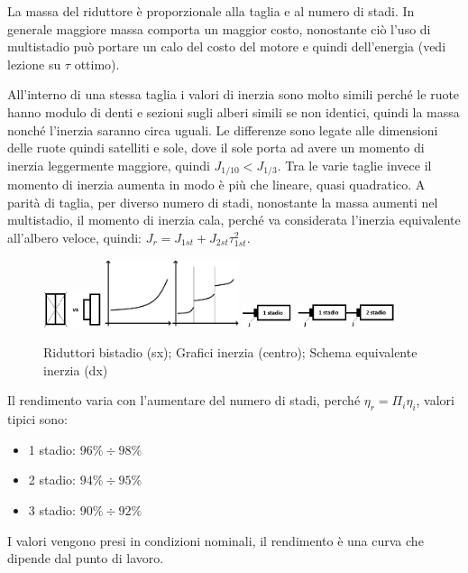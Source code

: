 La massa del riduttore è proporzionale alla taglia e al numero di stadi. 
In generale maggiore massa comporta un maggior costo, nonostante ciò l'uso di multistadio può portare un calo del costo del motore e quindi dell'energia (vedi lezione su $\tau$ ottimo).

All'interno di una stessa taglia i valori di inerzia sono molto simili perché le ruote hanno modulo di denti e sezioni sugli alberi simili se non identici, quindi la massa nonché l'inerzia saranno circa uguali.
Le differenze sono legate alle dimensioni delle ruote quindi satelliti e sole, dove il sole porta ad avere un momento di inerzia leggermente maggiore, quindi $J_{1/10}<J_{1/3}$.
Tra le varie taglie invece il momento di inerzia aumenta in modo è più che lineare, quasi quadratico.
A parità di taglia, per diverso numero di stadi, nonostante la massa aumenti nel multistadio, il momento di inerzia cala, perché va considerata l'inerzia equivalente all'albero veloce, quindi: $J_r=J_{1st}+J_{2st}\tau_{1st}^2$.

\begin{figure}[h]
    \centering
    \includegraphics[width=0.15\textwidth]{Immagini/ridutt_2st_diff_dim.png}
    \includegraphics[width=0.35\textwidth]{Immagini/momento_inerzia_stadi.png}
    \includegraphics[width=0.4\textwidth]{Immagini/momento_inerzia_albero_veloce.png}
    \caption{Riduttori bistadio (sx); Grafici inerzia (centro); Schema equivalente inerzia (dx)}
\end{figure}

Il rendimento varia con l'aumentare del numero di stadi, perché $\eta_r=\Pi_i \eta_i$, valori tipici sono:
\begin{itemize}
    \item 1 stadio: $96\% \div 98\%$
    \item 2 stadio: $94\% \div 95\%$
    \item 3 stadio: $90\% \div 92\%$
\end{itemize}
I valori vengono presi in condizioni nominali, il rendimento è una curva che dipende dal punto di lavoro.

